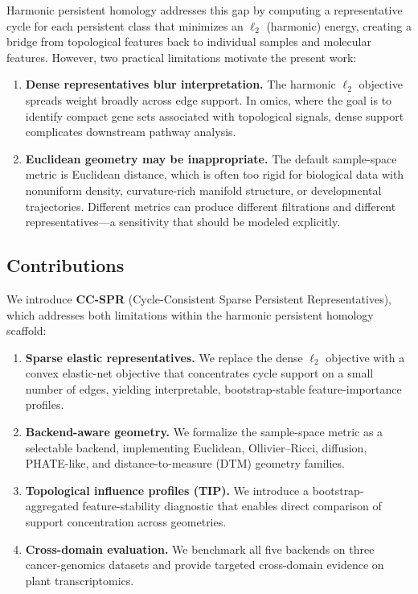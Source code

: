 \documentclass[12pt]{article}
\begin{document}
Harmonic persistent homology \cite{harmonicPH} addresses this gap by computing a representative cycle for each persistent class that minimizes an $\ell_2$ (harmonic) energy, creating a bridge from topological features back to individual samples and molecular features.
However, two practical limitations motivate the present work:
\begin{enumerate}[leftmargin=1.5em]
\item \textbf{Dense representatives blur interpretation.}
The harmonic $\ell_2$ objective spreads weight broadly across edge support.
In omics, where the goal is to identify compact gene sets associated with topological signals, dense support complicates downstream pathway analysis.
\item \textbf{Euclidean geometry may be inappropriate.}
The default sample-space metric is Euclidean distance, which is often too rigid for biological data with nonuniform density, curvature-rich manifold structure, or developmental trajectories.
Different metrics can produce different filtrations and different representatives---a sensitivity that should be modeled explicitly.
\end{enumerate}

\subsection{Contributions}

We introduce \textbf{CC-SPR} (Cycle-Consistent Sparse Persistent Representatives), which addresses both limitations within the harmonic persistent homology scaffold:
\begin{enumerate}[leftmargin=1.5em]
\item \textbf{Sparse elastic representatives.} We replace the dense $\ell_2$ objective with a convex elastic-net objective that concentrates cycle support on a small number of edges, yielding interpretable, bootstrap-stable feature-importance profiles.
\item \textbf{Backend-aware geometry.} We formalize the sample-space metric as a selectable backend, implementing Euclidean, Ollivier--Ricci, diffusion, PHATE-like, and distance-to-measure (DTM) geometry families.
\item \textbf{Topological influence profiles (TIP).} We introduce a bootstrap-aggregated feature-stability diagnostic that enables direct comparison of support concentration across geometries.
\item \textbf{Cross-domain evaluation.} We benchmark all five backends on three cancer-genomics datasets and provide targeted cross-domain evidence on plant transcriptomics.
\end{enumerate}
\end{document}
